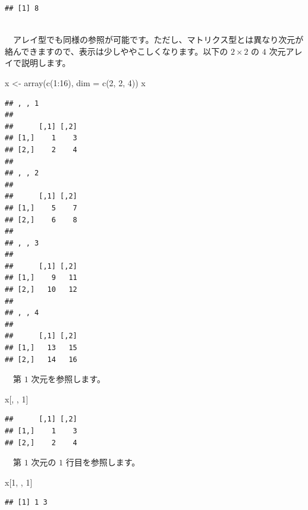 \documentclass[
  12pt,
]{book}
\newenvironment{Shaded}{\begin{snugshade}}{\end{snugshade}}
\newcommand{\AttributeTok}[1]{\textcolor[rgb]{0.77,0.63,0.00}{#1}}
\newcommand{\DecValTok}[1]{\textcolor[rgb]{0.00,0.00,0.81}{#1}}
\newcommand{\FunctionTok}[1]{\textcolor[rgb]{0.00,0.00,0.00}{#1}}
\newcommand{\NormalTok}[1]{#1}
\newcommand{\OtherTok}[1]{\textcolor[rgb]{0.56,0.35,0.01}{#1}}
\newcommand{\SpecialCharTok}[1]{\textcolor[rgb]{0.00,0.00,0.00}{#1}}
\begin{document}
\begin{verbatim}
## [1] 8
\end{verbatim}

　\\
　アレイ型でも同様の参照が可能です。ただし、マトリクス型とは異なり次元が絡んできますので、表示は少しややこしくなります。以下の \(2 \times 2\) の \(4\) 次元アレイで説明します。

\begin{Shaded}
\begin{Highlighting}[]
\NormalTok{x }\OtherTok{\textless{}{-}} \FunctionTok{array}\NormalTok{(}\FunctionTok{c}\NormalTok{(}\DecValTok{1}\SpecialCharTok{:}\DecValTok{16}\NormalTok{), }\AttributeTok{dim =} \FunctionTok{c}\NormalTok{(}\DecValTok{2}\NormalTok{, }\DecValTok{2}\NormalTok{, }\DecValTok{4}\NormalTok{))}
\NormalTok{x}
\end{Highlighting}
\end{Shaded}

\begin{verbatim}
## , , 1
## 
##      [,1] [,2]
## [1,]    1    3
## [2,]    2    4
## 
## , , 2
## 
##      [,1] [,2]
## [1,]    5    7
## [2,]    6    8
## 
## , , 3
## 
##      [,1] [,2]
## [1,]    9   11
## [2,]   10   12
## 
## , , 4
## 
##      [,1] [,2]
## [1,]   13   15
## [2,]   14   16
\end{verbatim}

　第 \(1\) 次元を参照します。

\begin{Shaded}
\begin{Highlighting}[]
\NormalTok{x[, , }\DecValTok{1}\NormalTok{]}
\end{Highlighting}
\end{Shaded}

\begin{verbatim}
##      [,1] [,2]
## [1,]    1    3
## [2,]    2    4
\end{verbatim}

　第 \(1\) 次元の \(1\) 行目を参照します。

\begin{Shaded}
\begin{Highlighting}[]
\NormalTok{x[}\DecValTok{1}\NormalTok{, , }\DecValTok{1}\NormalTok{]}
\end{Highlighting}
\end{Shaded}

\begin{verbatim}
## [1] 1 3
\end{verbatim}
\end{document}
